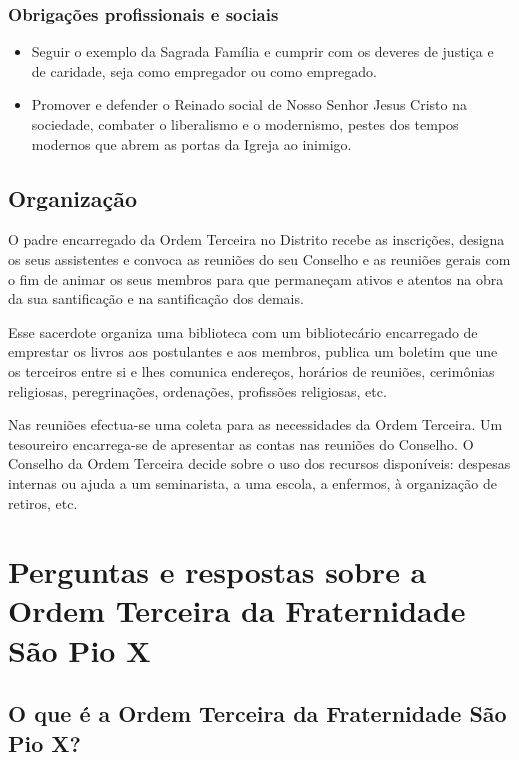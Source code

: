 \documentclass[11pt]{article}
\begin{document}
\subsubsection{Obrigações profissionais e sociais}

\begin{itemize}
	\item Seguir o exemplo da Sagrada Família e cumprir com os deveres de justiça e de caridade, seja como empregador ou como empregado.
    \item Promover e defender o Reinado social de Nosso Senhor Jesus Cristo na sociedade, combater o liberalismo e o modernismo, pestes dos tempos modernos que abrem as portas da Igreja ao inimigo.
\end{itemize}

\subsection{Organização}\label{subsec:organização}

O padre encarregado da Ordem Terceira no Distrito recebe as inscrições, designa os seus assistentes e convoca as reuniões do seu Conselho e as reuniões gerais com o fim de animar os seus membros para que permaneçam ativos e atentos na obra da sua santificação e na santificação dos demais.

Esse sacerdote organiza uma biblioteca com um bibliotecário encarregado de emprestar os livros aos postulantes e aos membros, publica um boletim que une os terceiros entre si e lhes comunica endereços, horários de reuniões, cerimônias religiosas, peregrinações, ordenações, profissões religiosas, etc.

Nas reuniões efectua-se uma coleta para as necessidades da Ordem Terceira.
Um tesoureiro encarrega-se de apresentar as contas nas reuniões do Conselho.
O Conselho da Ordem Terceira decide sobre o uso dos recursos disponíveis: despesas internas ou ajuda a um seminarista, a uma escola, a enfermos, à organização de retiros, etc.

\section{Perguntas e respostas sobre a Ordem Terceira da Fraternidade São Pio X}\label{sec:perguntas-e-respostas-sobre-a-ordem-terceira-da-fraternidade-são-pio-x}

\subsection{O que é a Ordem Terceira da Fraternidade São Pio X?}\label{subsec:o-que-é-a-ordem-terceira-da-fraternidade-são-pio-x?}
\end{document}
